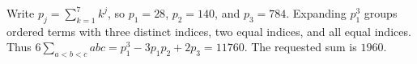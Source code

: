 Write $p_j=\sum_{k=1}^7k^j$, so $p_1=28$, $p_2=140$, and $p_3=784$. Expanding $p_1^3$ groups ordered terms with three distinct indices, two equal indices, and all equal indices. Thus $6\sum_{a<b<c}abc=p_1^3-3p_1p_2+2p_3=11760$. The requested sum is $\boxed{1960}$.
